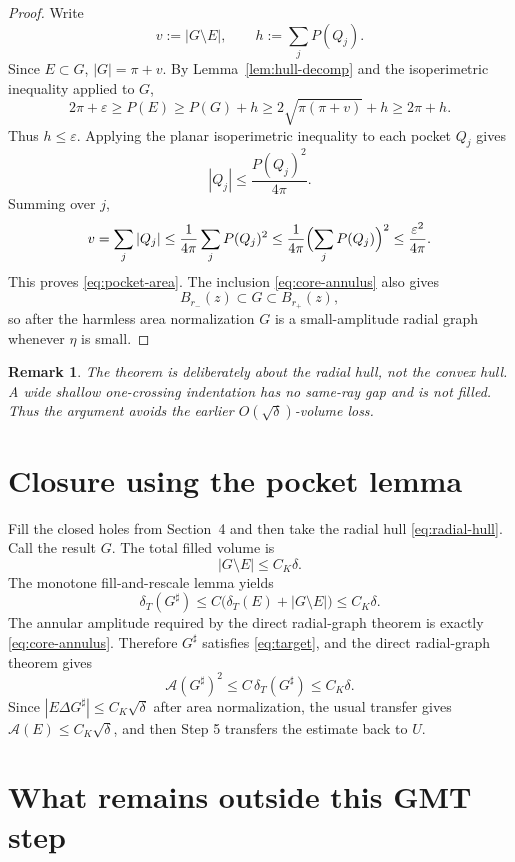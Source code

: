 \documentclass[11pt]{article}
\newtheorem{remark}[theorem]{Remark}
\newcommand{\dT}{\delta_T}
\newcommand{\A}{\mathcal A}
\begin{document}
\begin{proof}
Write
\[
   v:=|G\setminus E|,\qquad h:=\sum_jP(Q_j).
\]
Since \(E\subset G\), \(|G|=\pi+v\).  By Lemma~\ref{lem:hull-decomp} and the
isoperimetric inequality applied to \(G\),
\[
   2\pi+\varepsilon
      \ge P(E)
      \ge P(G)+h
      \ge 2\sqrt{\pi(\pi+v)}+h
      \ge 2\pi+h .
   \tag{5.6}
\]
Thus \(h\le\varepsilon\).  Applying the planar isoperimetric inequality to
each pocket \(Q_j\) gives
\[
   |Q_j|\le \frac{P(Q_j)^2}{4\pi}.
\]
Summing over \(j\),
\[
   v
      =\sum_j |Q_j|
      \le \frac1{4\pi}\sum_jP(Q_j)^2
      \le \frac1{4\pi}\Bigl(\sum_jP(Q_j)\Bigr)^2
      \le \frac{\varepsilon^2}{4\pi}.
\]
This proves \eqref{eq:pocket-area}.  The inclusion
\eqref{eq:core-annulus} also gives
\[
   B_{r_-}(z)\subset G\subset B_{r_+}(z),
\]
so after the harmless area normalization \(G\) is a small-amplitude radial
graph whenever \(\eta\) is small.
\end{proof}

\begin{remark}
The theorem is deliberately about the radial hull, not the convex hull.  A
wide shallow one-crossing indentation has no same-ray gap and is not filled.
Thus the argument avoids the earlier \(O(\sqrt\delta)\)-volume loss.
\end{remark}

\section{Closure using the pocket lemma}

Fill the closed holes from Section~4 and then take the radial hull
\eqref{eq:radial-hull}.  Call the result \(G\).  The total filled volume is
\[
   |G\setminus E|\le C_K\delta .
   \tag{6.1}
\]
The monotone fill-and-rescale lemma yields
\[
   \dT(G^\sharp)
      \le C\bigl(\dT(E)+|G\setminus E|\bigr)
      \le C_K\delta .
   \tag{6.2}
\]
The annular amplitude required by the direct radial-graph theorem is exactly
\eqref{eq:core-annulus}.  Therefore \(G^\sharp\) satisfies
\eqref{eq:target}, and the direct radial-graph theorem gives
\[
   \A(G^\sharp)^2\le C\,\dT(G^\sharp)\le C_K\delta .
   \tag{6.3}
\]
Since \(|E\Delta G^\sharp|\le C_K\sqrt\delta\) after area normalization, the
usual transfer gives \(\A(E)\le C_K\sqrt\delta\), and then Step 5 transfers
the estimate back to \(U\).

\section{What remains outside this GMT step}
\end{document}
